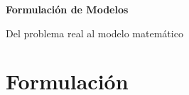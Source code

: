 \documentclass[aspectratio=169,10pt]{beamer}
\begin{document}
\begin{frame}
\begin{center}
\vspace{1.5cm}
\Huge \textbf{Formulación de Modelos}

\vspace{0.5cm}
\Large Del problema real al modelo matemático
\end{center}
\end{frame}

\section{Formulación}
\end{document}
